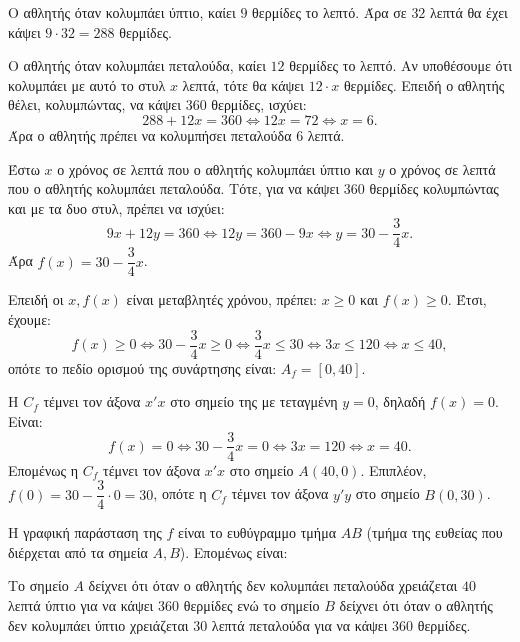 
\begin{alist}
\item Ο αθλητής όταν κολυμπάει ύπτιο, καίει $9$ θερμίδες το λεπτό. Άρα σε $32$ λεπτά θα έχει κάψει
$9 \cdot 32 = 288$ θερμίδες.

Ο αθλητής όταν κολυμπάει πεταλούδα, καίει $12$ θερμίδες το λεπτό. Αν υποθέσουμε ότι κολυμπάει με αυτό το στυλ $x$ λεπτά, τότε θα κάψει $12 \cdot x$ θερμίδες. Επειδή ο αθλητής θέλει, κολυμπώντας, να κάψει $360$ θερμίδες, ισχύει:
\[288 + 12x = 360 \Leftrightarrow 12x = 72 \Leftrightarrow x = 6.\]
Άρα ο αθλητής πρέπει να κολυμπήσει πεταλούδα $6$ λεπτά.

\item
\begin{rlist}
\item Έστω $x$ ο χρόνος σε λεπτά που ο αθλητής κολυμπάει ύπτιο και $y$ ο χρόνος σε λεπτά που ο αθλητής κολυμπάει πεταλούδα. Τότε, για να κάψει $360$ θερμίδες κολυμπώντας και με τα δυο στυλ, πρέπει να ισχύει:
\[9x + 12y = 360 \Leftrightarrow 12y = 360 - 9x \Leftrightarrow y = 30 - \dfrac{3}{4}x.\]
Άρα $f(x) = 30 - \dfrac{3}{4}x$.

\item Επειδή οι $x, f(x)$ είναι μεταβλητές χρόνου, πρέπει: $x \ge 0$ και $f(x) \ge 0$. Έτσι, έχουμε:
\[f(x) \ge 0 \Leftrightarrow 30 - \dfrac{3}{4}x \ge 0 \Leftrightarrow \dfrac{3}{4}x \le 30 \Leftrightarrow 3x \le 120 \Leftrightarrow x \le 40,\]
οπότε το πεδίο ορισμού της συνάρτησης είναι: $A_f = [0, 40]$.
\end{rlist}

\item Η $C_f$ τέμνει τον άξονα $x'x$ στο σημείο της με τεταγμένη $y = 0$, δηλαδή $f(x) = 0$. Είναι:
\[f(x) = 0 \Leftrightarrow 30 - \dfrac{3}{4}x = 0 \Leftrightarrow 3x = 120 \Leftrightarrow x = 40.\]
Επομένως η $C_f$ τέμνει τον άξονα $x'x$ στο σημείο $A(40, 0)$. Επιπλέον,
$f(0) = 30 - \dfrac{3}{4} \cdot 0 = 30$,
οπότε η $C_f$ τέμνει τον άξονα $y'y$ στο σημείο $B(0, 30)$.

Η γραφική παράσταση της $f$ είναι το ευθύγραμμο τμήμα $AB$ (τμήμα της ευθείας που διέρχεται από τα σημεία $A, B$). Επομένως είναι:

Το σημείο $A$ δείχνει ότι όταν ο αθλητής δεν κολυμπάει πεταλούδα χρειάζεται $40$ λεπτά ύπτιο για να κάψει $360$ θερμίδες ενώ το σημείο $B$ δείχνει ότι όταν ο αθλητής δεν κολυμπάει ύπτιο χρειάζεται $30$ λεπτά πεταλούδα για να κάψει $360$ θερμίδες.
\end{alist}

